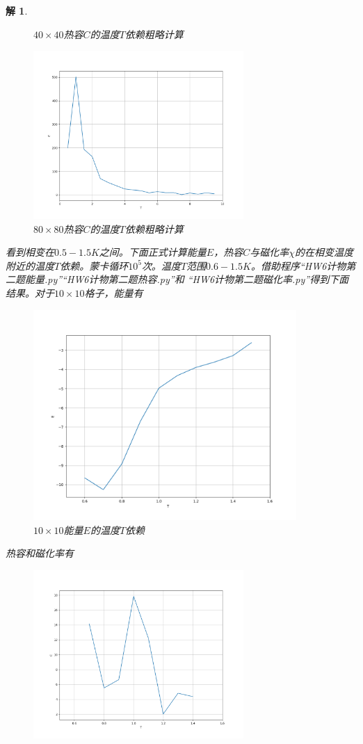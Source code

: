 \documentclass[10pt]{ctexart}
\newtheorem*{solution}{解}
\begin{document}
\begin{solution}
\begin{figure}[H]
\begin{minipage}{0.45\linewidth}
            \caption{$40\times 40$热容$C$的温度$T$依赖粗略计算}
        \end{minipage}
        \qquad
        \begin{minipage}{0.45\linewidth}
            \centering
            \includegraphics[width=8cm]{Rough_80.png}
            \caption{$80\times 80$热容$C$的温度$T$依赖粗略计算}
        \end{minipage}
    \end{figure}
    看到相变在$0.5-1.5K$之间。下面正式计算能量$E$，热容$C$与磁化率$\chi$的在相变温度附近的温度$T$依赖。蒙卡循环$10^5$次。温度$T$范围$0.6-1.5K$。借助程序“HW6计物第二题能量.py”“HW6计物第二题热容.py”和
    “HW6计物第二题磁化率.py”得到下面结果。对于$10\times 10$格子，能量有
    \begin{figure}[H]
        \centering
        \includegraphics[width=10cm]{E_10.png}
        \caption{$10\times 10$能量$E$的温度$T$依赖}
    \end{figure}
    热容和磁化率有
    \begin{figure}[H]
        \centering
        \begin{minipage}{0.45\linewidth}
            \centering
            \includegraphics[width=8cm]{C_10.png}

\end{minipage}
\end{figure}
\end{solution}
\end{document}
